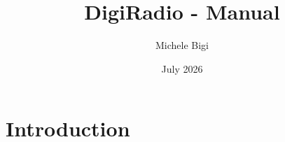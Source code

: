 \documentclass{article}
\title{DigiRadio - Manual}
\author{Michele Bigi}
\date{July 2026}
\begin{document}
\maketitle

\section{Introduction}
\end{document}
